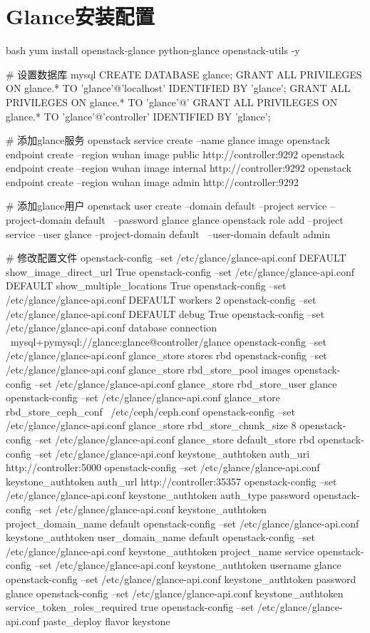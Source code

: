 \section{Glance安装配置}
\begin{code-block}{bash}
yum install openstack-glance python-glance openstack-utils -y

# 设置数据库
mysql
CREATE DATABASE glance;
GRANT ALL PRIVILEGES ON glance.* TO 'glance'@'localhost' IDENTIFIED BY 'glance';
GRANT ALL PRIVILEGES ON glance.* TO 'glance'@'%
GRANT ALL PRIVILEGES ON glance.* TO 'glance'@'controller' IDENTIFIED BY 'glance';

# 添加glance服务
openstack service create --name glance  image
openstack endpoint create --region wuhan image public http://controller:9292
openstack endpoint create --region wuhan image internal http://controller:9292
openstack endpoint create --region wuhan image admin http://controller:9292

# 添加glance用户
openstack user create --domain default --project service --project-domain default \
    --password glance glance
openstack role add --project service --user glance --project-domain default \
    --user-domain default admin

# 修改配置文件
openstack-config --set /etc/glance/glance-api.conf DEFAULT show_image_direct_url True
openstack-config --set /etc/glance/glance-api.conf DEFAULT show_multiple_locations True
openstack-config --set /etc/glance/glance-api.conf DEFAULT workers 2
openstack-config --set /etc/glance/glance-api.conf DEFAULT debug True
openstack-config --set /etc/glance/glance-api.conf database connection \
    mysql+pymysql://glance:glance@controller/glance
openstack-config --set /etc/glance/glance-api.conf glance_store stores rbd
openstack-config --set /etc/glance/glance-api.conf glance_store rbd_store_pool images
openstack-config --set /etc/glance/glance-api.conf glance_store rbd_store_user glance
openstack-config --set /etc/glance/glance-api.conf glance_store rbd_store_ceph_conf \
    /etc/ceph/ceph.conf
openstack-config --set /etc/glance/glance-api.conf glance_store rbd_store_chunk_size 8
openstack-config --set /etc/glance/glance-api.conf glance_store default_store rbd
openstack-config --set /etc/glance/glance-api.conf keystone_authtoken auth_uri http://controller:5000
openstack-config --set /etc/glance/glance-api.conf keystone_authtoken auth_url http://controller:35357
openstack-config --set /etc/glance/glance-api.conf keystone_authtoken auth_type password
openstack-config --set /etc/glance/glance-api.conf keystone_authtoken project_domain_name default
openstack-config --set /etc/glance/glance-api.conf keystone_authtoken user_domain_name default
openstack-config --set /etc/glance/glance-api.conf keystone_authtoken project_name service
openstack-config --set /etc/glance/glance-api.conf keystone_authtoken username glance
openstack-config --set /etc/glance/glance-api.conf keystone_authtoken password glance
openstack-config --set /etc/glance/glance-api.conf keystone_authtoken service_token_roles_required true
openstack-config --set /etc/glance/glance-api.conf paste_deploy flavor keystone


\end{code-block}
